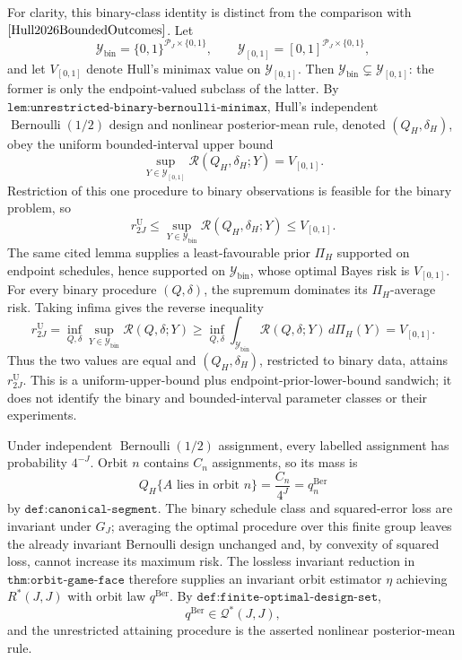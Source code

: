 For clarity, this binary-class identity is distinct from the comparison with \(\cite{Hull2026BoundedOutcomes}\).  Let
\[
 \mathcal Y_{\mathrm{bin}}=\{0,1\}^{\mathcal P_J\times\{0,1\}},
 \qquad
 \mathcal Y_{[0,1]}=[0,1]^{\mathcal P_J\times\{0,1\}},
\]
and let \(V_{[0,1]}\) denote Hull's minimax value on \(\mathcal Y_{[0,1]}\).  Then \(\mathcal Y_{\mathrm{bin}}\subsetneq\mathcal Y_{[0,1]}\): the former is only the endpoint-valued subclass of the latter.  By \(\texttt{lem:unrestricted-binary-bernoulli-minimax}\), Hull's independent \(\operatorname{Bernoulli}(1/2)\) design and nonlinear posterior-mean rule, denoted \((Q_H,\delta_H)\), obey the uniform bounded-interval upper bound
\[
 \sup_{Y\in\mathcal Y_{[0,1]}}
 \mathcal R(Q_H,\delta_H;Y)=V_{[0,1]}.
\]
Restriction of this one procedure to binary observations is feasible for the binary problem, so
\[
 r^{\mathrm U}_{2J}
 \le \sup_{Y\in\mathcal Y_{\mathrm{bin}}}
 \mathcal R(Q_H,\delta_H;Y)
 \le V_{[0,1]}.
\]
The same cited lemma supplies a least-favourable prior \(\Pi_H\) supported on endpoint schedules, hence supported on \(\mathcal Y_{\mathrm{bin}}\), whose optimal Bayes risk is \(V_{[0,1]}\).  For every binary procedure \((Q,\delta)\), the supremum dominates its \(\Pi_H\)-average risk.  Taking infima gives the reverse inequality
\[
 r^{\mathrm U}_{2J}
 =\inf_{Q,\delta}\sup_{Y\in\mathcal Y_{\mathrm{bin}}}
 \mathcal R(Q,\delta;Y)
 \ge
 \inf_{Q,\delta}\int_{\mathcal Y_{\mathrm{bin}}}
 \mathcal R(Q,\delta;Y)\,d\Pi_H(Y)
 =V_{[0,1]}.
\]
Thus the two values are equal and \((Q_H,\delta_H)\), restricted to binary data, attains \(r^{\mathrm U}_{2J}\).  This is a uniform-upper-bound plus endpoint-prior-lower-bound sandwich; it does not identify the binary and bounded-interval parameter classes or their experiments.

Under independent \(\operatorname{Bernoulli}(1/2)\) assignment, every labelled assignment has probability \(4^{-J}\).  Orbit \(n\) contains \(C_n\) assignments, so its mass is
\[
 Q_H\{A\text{ lies in orbit }n\}=\frac{C_n}{4^J}=q_n^{\mathrm{Ber}}
\]
by \(\texttt{def:canonical-segment}\).  The binary schedule class and squared-error loss are invariant under \(G_J\); averaging the optimal procedure over this finite group leaves the already invariant Bernoulli design unchanged and, by convexity of squared loss, cannot increase its maximum risk.  The lossless invariant reduction in \(\texttt{thm:orbit-game-face}\) therefore supplies an invariant orbit estimator \(\eta\) achieving \(R^*(J,J)\) with orbit law \(q^{\mathrm{Ber}}\).  By \(\texttt{def:finite-optimal-design-set}\),
\[
 q^{\mathrm{Ber}}\in\mathcal Q^*(J,J),
\]
and the unrestricted attaining procedure is the asserted nonlinear posterior-mean rule.
